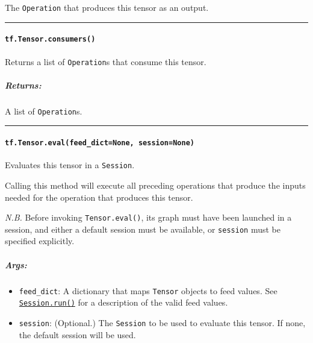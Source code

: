 The \lstinline{Operation} that produces this tensor as an output.

\begin{center}\rule{0.5\linewidth}{\linethickness}\end{center}

\paragraph{\texorpdfstring{\lstinline{tf.Tensor.consumers()}
}{tf.Tensor.consumers() }}\label{tf.tensor.consumers}

Returns a list of \lstinline{Operation}s that consume this tensor.

\subparagraph{Returns: }\label{returns-19}

A list of \lstinline{Operation}s.

\begin{center}\rule{0.5\linewidth}{\linethickness}\end{center}

\paragraph{\texorpdfstring{\lstinline{tf.Tensor.eval(feed_dict=None, session=None)}
}{tf.Tensor.eval(feed_dict=None, session=None) }}\label{tf.tensor.evalfeedux5fdictnone-sessionnone}

Evaluates this tensor in a \lstinline{Session}.

Calling this method will execute all preceding operations that produce
the inputs needed for the operation that produces this tensor.

\emph{N.B.} Before invoking \lstinline{Tensor.eval()}, its graph must have
been launched in a session, and either a default session must be
available, or \lstinline{session} must be specified explicitly.

\subparagraph{Args: }\label{args-15}

\begin{itemize}
\tightlist
\item
  \lstinline{feed_dict}: A dictionary that maps \lstinline{Tensor} objects to
  feed values. See
  \href{../../api_docs/python/client.md\#Session.run}{\lstinline{Session.run()}}
  for a description of the valid feed values.
\item
  \lstinline{session}: (Optional.) The \lstinline{Session} to be used to
  evaluate this tensor. If none, the default session will be used.
\end{itemize}

